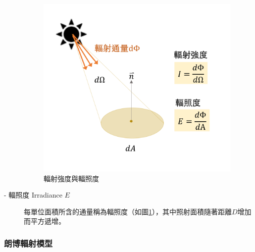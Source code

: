 \begin{description}
            \begin{figure}[htpb]
                \centering
                \includegraphics[width=10cm]{ch2pic/intensity_irradiance.png}
                \caption{輻射強度與輻照度}
                \label{pic:intensity_irradiance}
            \end{figure}

        \item[- 輻照度 Irradiance $E$] \hfill
            
            \qquad
            每單位面積所含的通量稱為輻照度（如圖\ref{pic:intensity_irradiance}），其中照射面積隨著距離$D$增加而平方遞增。

            
            
    \end{description}


    



    
    \subsubsection{朗博輻射模型}
        \label{chp:lambertian}

